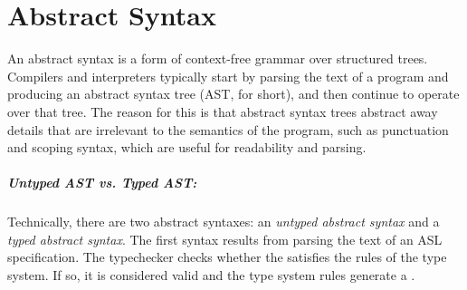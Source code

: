 \chapter{Abstract Syntax\label{chap:AbstractSyntax}}
An abstract syntax is a form of context-free grammar over structured trees.
Compilers and interpreters typically start by parsing the text of a program and producing an abstract syntax tree (AST, for short),
and then continue to operate over that tree.
%
The reason for this is that abstract syntax trees abstract away details that are irrelevant to the semantics of the program,
such as punctuation and scoping syntax, which are useful for readability and parsing.


\hypertarget{def-typedast}{}
\hypertarget{def-untypedast}{}
\paragraph{Untyped AST vs. Typed AST:}
Technically, there are two abstract syntaxes:
an \emph{untyped abstract syntax} and a \emph{typed abstract syntax}.
The first syntax results from parsing the text of an ASL specification.
The typechecker checks whether the \untypedast{} satisfies the rules of the
type system. If so, it is considered valid and the type system rules
generate a \typedast.

